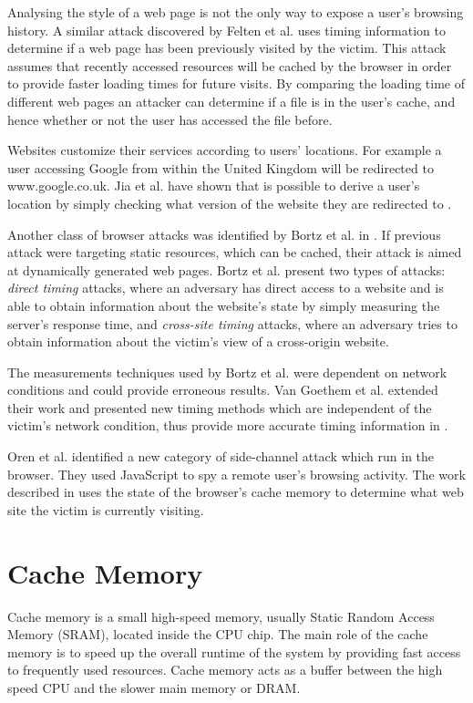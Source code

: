 \documentclass[10pt,a4paper,twoside]{book}
\begin{document}
Analysing the style of a web page is not the only way to expose a user's browsing history. A similar attack discovered by Felten et al. \cite{felten2000timing} uses timing information to determine if a web page has been previously visited by the victim. This attack assumes that recently accessed resources will be cached by the browser in order to provide faster loading times for future visits. By comparing the loading time of different web pages an attacker can determine if a file is in the user’s cache, and hence whether or not the user has accessed the file before.

Websites customize their services according to users’ locations. For example a user accessing Google from within the United Kingdom will be redirected to www.google.co.uk. Jia et al. have shown that is possible to derive a user’s location by simply checking what version of the website they are redirected to \cite{jia2015know}.

Another class of browser attacks was identified by Bortz et al. in \cite{bortz2007exposing}. If previous attack were targeting static resources, which can be cached, their attack is aimed at dynamically generated web pages. Bortz et al. present two types of attacks: \textit{direct timing} attacks, where an adversary has direct access to a website and is able to obtain information about the website's state by simply measuring the server's response time, and \textit{cross-site timing} attacks, where an adversary tries to obtain information about the victim's view of a cross-origin website.

The measurements techniques used by Bortz et al. were dependent on network conditions and could provide erroneous results. Van Goethem et al. extended their work and presented new timing methods which are independent of the victim's network condition, thus provide more accurate timing information in \cite{van2015clock}. 

Oren et al. \cite{oren2015spy} identified a new category of side-channel attack which run in the browser. They used JavaScript to spy a remote user's browsing activity. The work described in \cite{oren2015spy} uses the state of the browser's cache memory to determine what web site the victim is currently visiting.

\section{Cache Memory}

Cache memory is a small high-speed memory, usually Static Random Access Memory (SRAM), located inside the CPU chip. The main role of the cache memory is to speed up the overall runtime of the system by providing fast access to frequently used resources. Cache memory acts as a buffer between the high speed CPU and the slower main memory or DRAM.
\end{document}
